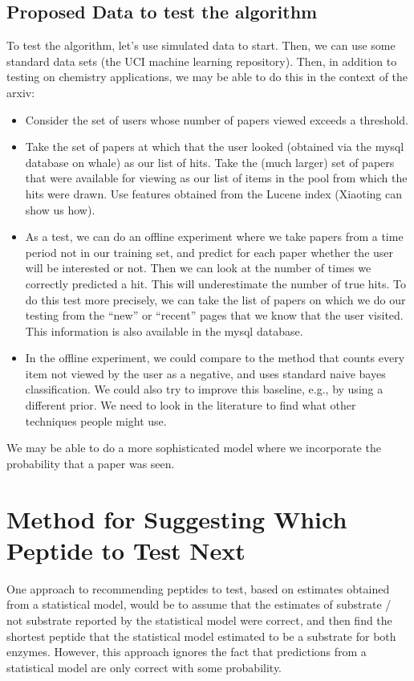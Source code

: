 \documentclass[12pt]{article}
\begin{document}
\subsection{Proposed Data to test the algorithm}

To test the algorithm, let's use simulated data to start.  Then, we can use some standard data sets (the UCI machine learning repository).  Then, in addition to testing on chemistry applications, we may be able to do this in the context of the arxiv:

\begin{itemize}
\item Consider the set of users whose number of papers viewed exceeds a threshold.
\item Take the set of papers at which that the user looked (obtained via the mysql database on whale) as our list of hits.  Take the (much larger) set of papers that were available for viewing as our list of items in the pool from which the hits were drawn.  Use features obtained from the Lucene index (Xiaoting can show us how).
\item As a test, we can do an offline experiment where we take papers from a time period not in our training set, and predict for each paper whether the user will be interested or not.  Then we can look at the number of times we correctly predicted a hit.  This will underestimate the number of true hits.  To do this test more precisely, we can take the list of papers on which we do our testing from the ``new'' or ``recent'' pages that we know that the user visited.  This information is also available in the mysql database.   
\item In the offline experiment, we could compare to the method that counts every item not viewed by the user as a negative, and uses standard naive bayes classification.  We could also try to improve this baseline, e.g., by using a different prior.  We need to look in the literature to find what other techniques people might use.
\end{itemize}

We may be able to do a more sophisticated model where we incorporate the probability that a paper was seen.

\section{Method for Suggesting Which Peptide to Test Next}
\label{sec:design}
One approach to recommending peptides to test, based on estimates obtained from
a statistical model, would be to assume that the estimates of substrate / not
substrate reported by the statistical model were correct, and then find the
shortest peptide that the statistical model estimated to be a substrate for
both enzymes.  However, this approach ignores the fact that predictions from a
statistical model are only correct with some probability.  
\end{document}
